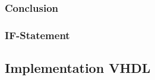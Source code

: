 \subsubsection*{Conclusion}


\subsubsection*{IF-Statement} \label{ch:data:if}



\subsection{Implementation VHDL} \label{ch:controller:vhdl}
